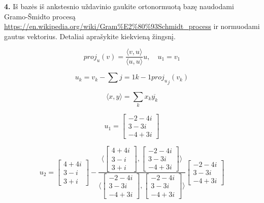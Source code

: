\documentclass{article}
\begin{document}
\pagebreak

\textbf{4.} Iš bazės iš ankstesnio uždavinio gaukite ortonormuotą bazę naudodami Gramo-Šmidto procesą \url{https://en.wikipedia.org/wiki/Gram%E2%80%93Schmidt_process} ir normuodami gautus vektorius. Detaliai aprašykite kiekvieną žingsnį.


\begin{equation}
    proj_u(v)=\frac{\langle v,u \rangle}{\langle u,u \rangle}u, \quad u_1 = v_1\nonumber
\end{equation}

\begin{equation}
    u_k=v_k-\sum j =1k-1{proj_u}_j(v_k)\nonumber
\end{equation}

\begin{equation}
    \langle x,y \rangle = \sum_{k}x_k\overline{y_k}\nonumber
\end{equation}


\begin{equation}
u_1=
\begin{bmatrix}
-2-4i\\
3-3i\\
-4+3i
\end{bmatrix}\nonumber
\end{equation}

\begin{equation}
u_2=
\begin{bmatrix}
4+4i\\
3-i\\
3+i
\end{bmatrix}\nonumber
-
\frac{\langle 
\begin{bmatrix}
4+4i\\
3-i\\
3+i
\end{bmatrix}
,
\begin{bmatrix}
-2-4i\\
3-3i\\
-4+3i
\end{bmatrix}
\rangle}{\langle 
\begin{bmatrix}
-2-4i\\
3-3i\\
-4+3i
\end{bmatrix},\begin{bmatrix}
-2-4i\\
3-3i\\
-4+3i
\end{bmatrix}
\rangle}
\begin{bmatrix}
-2-4i\\
3-3i\\
-4+3i
\end{bmatrix}
\end{equation}
\end{document}
